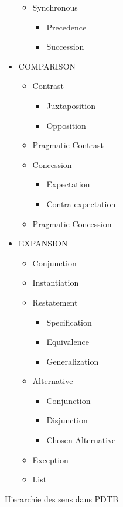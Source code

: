 \documentclass[xcolor=table]{beamer}
\begin{document}
\begin{frame}
\begin{figure}
\begin{minipage}{.3\textwidth}
\begin{itemize}
\begin{itemize}
					\item Synchronous
					\begin{itemize}\tiny\bfseries
						\item Precedence
						\item Succession
					\end{itemize}
				\end{itemize}
				\item COMPARISON
				\begin{itemize}\tiny\bfseries
					\item Contrast
					\begin{itemize}\tiny\bfseries
						\item Juxtaposition 
						\item Opposition
					\end{itemize}
					\item Pragmatic Contrast
					\item Concession
					\begin{itemize}\tiny\bfseries
						\item Expectation
						\item Contra-expectation
					\end{itemize}
					\item Pragmatic Concession
				\end{itemize}
			\end{itemize}
		\end{minipage}
		\begin{minipage}{.3\textwidth}
			\tiny\bfseries
			\begin{itemize}\tiny\bfseries
				\item EXPANSION
				\begin{itemize}\tiny\bfseries
					\item Conjunction
					\item Instantiation
					\item Restatement
					\begin{itemize}\tiny\bfseries
						\item Specification
						\item Equivalence
						\item Generalization
					\end{itemize}
					\item Alternative
					\begin{itemize}\tiny\bfseries
						\item Conjunction
						\item Disjunction
						\item Chosen Alternative
					\end{itemize}
					\item Exception
					\item List
				\end{itemize}
			\end{itemize}
		\end{minipage}
		\caption{Hierarchie des sens dans PDTB \cite{2008-prasad-al}}
	\end{figure}



\end{frame}
\end{document}
